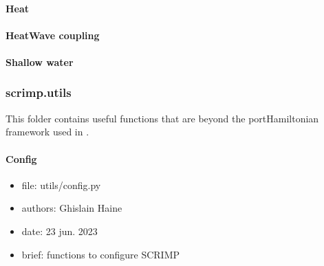 \documentclass[letterpaper,10pt,english]{sphinxmanual}
\begin{document}
\paragraph{Heat}
\label{\detokenize{scrimp.examples:heat}}

\paragraph{Heat\sphinxhyphen{}Wave coupling}
\label{\detokenize{scrimp.examples:heat-wave-coupling}}

\paragraph{Shallow water}
\label{\detokenize{scrimp.examples:shallow-water}}
\sphinxstepscope


\subsubsection{scrimp.utils}
\label{\detokenize{scrimp.utils:scrimp-utils}}\label{\detokenize{scrimp.utils::doc}}
\sphinxAtStartPar
This folder contains useful functions that are beyond the port\sphinxhyphen{}Hamiltonian framework used in .


\paragraph{Config}
\label{\detokenize{scrimp.utils:module-scrimp.utils.config}}\label{\detokenize{scrimp.utils:config}}\begin{itemize}
\item {} 
\sphinxAtStartPar
file:             utils/config.py

\item {} 
\sphinxAtStartPar
authors:          Ghislain Haine

\item {} 
\sphinxAtStartPar
date:             23 jun. 2023

\item {} 
\sphinxAtStartPar
brief:            functions to configure SCRIMP

\end{itemize}
\end{document}
